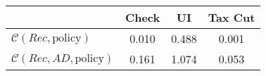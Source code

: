 \begin{tabular}{@{}lccc@{}} 
\toprule 
                          & Check      & UI    & Tax Cut    \\  \midrule 
$\mathcal{C}(Rec,\text{policy})$ & 0.010  & 0.488  & 0.001     \\ 
$\mathcal{C}(Rec, AD,\text{policy})$ & 0.161  & 1.074  & 0.053     \\ 
\end{tabular}  
